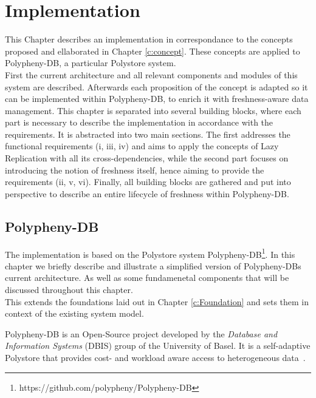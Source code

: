 \chapter{Implementation}
\label{c:implementation}

This Chapter describes an implementation in correspondance to the concepts proposed and ellaborated in Chapter \ref{c:concept}. 
These concepts are applied to Polypheny-DB, a particular Polystore system.\\
First the current architecture and all relevant components and modules of this system are described. Afterwards each proposition of the concept is adapted
so it can be implemented within Polypheny-DB, to enrich it with freshness-aware data management.
This chapter is separated into several building blocks, where each part is necessary to describe the implementation in accordance with the requirements.
It is abstracted into two main sections. The first addresses the functional requirements (i, iii, iv) and aims to apply the concepts of Lazy Replication with all its
cross-dependencies, while the second part focuses on introducing the notion of freshness itself, hence aiming to provide the requirements (ii, v, vi).
Finally, all building blocks are gathered and put into perspective to describe an entire lifecycle of freshness within Polypheny-DB. 





\section{Polypheny-DB}
\label{sec:architecture}


The implementation is based on the Polystore system Polypheny-DB\footnote{https://github.com/polypheny/Polypheny-DB}.
In this chapter we briefly describe and illustrate a simplified version of Polypheny-DBs current architecture.
As well as some fundamenetal components that will be discussed throughout this chapter.\\
This extends the foundations laid out in Chapter \ref{c:Foundation} and sets them in context of the existing system model.




Polypheny-DB is an Open-Source project developed by 
the \textit{Database and Information Systems} (DBIS) group of the University of Basel.
It is a self-adaptive Polystore that provides cost- and workload aware access to heterogeneous data~\cite{poly2020}.

